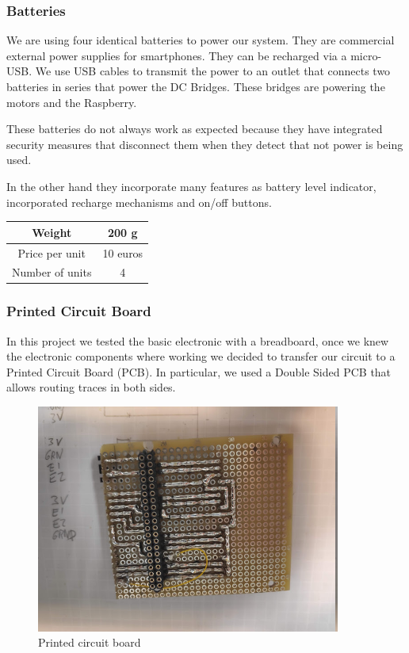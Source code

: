 \subsubsection{Batteries}
We are using four identical batteries to power our system. They are
commercial external power supplies for smartphones. They can be recharged
via a micro-USB. We use USB cables to transmit the power to an outlet
that connects two batteries in series that power the DC Bridges.
These bridges are powering the motors and the Raspberry.

These batteries do not always work as expected because they have
integrated security measures that disconnect them when they detect
that not power is being used.

In the other hand they incorporate many features as battery level
indicator, incorporated recharge mechanisms and on/off buttons.
\begin{center}
    \begin{tabular}{ |c|c| }
        \hline
        Weight          & 200 g    \\
        \hline
        Price per unit  & 10 euros \\
        \hline
        Number of units & 4        \\
        \hline
    \end{tabular}
\end{center}
\subsubsection{Printed Circuit Board}
In this project we tested the basic electronic with a breadboard, once we knew
the electronic components where working we decided to transfer our circuit to
a Printed Circuit Board (PCB). In particular, we used a Double Sided PCB that
allows routing traces in both sides.
\begin{figure}[H]
    \centering
    \includegraphics[width=10cm]{img/components/PCB.jpg}
    \caption{Printed circuit board}
    \label{fig: PCB}
\end{figure}

